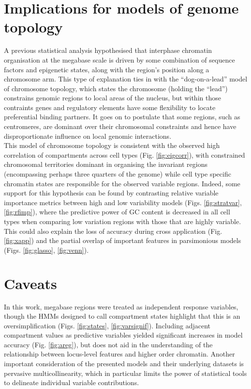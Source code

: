 \documentclass[a4paper]{report}
\begin{document}
\section{Implications for models of genome topology}
A previous statistical analysis hypothesised that interphase chromatin
organisation at the megabase scale is driven
by some combination of sequence factors and epigenetic states,
along with the region's position along a chromosome
arm.\cite{Imakaev2012} This type of explanation ties in with the ``dog-on-a-lead'' model of chromosome
topology,\cite{Krijger2013} which states the chromosome
(holding the ``lead'') constrains genomic regions to local areas of
the nucleus, but within those contraints genes and regulatory elements have some
flexibility to locate preferential binding partners.\cite{DeWit2013, Krijger2013}
It goes on to postulate that some regions, such as centromeres, are dominant over their
chromosomal constraints and hence have
disproportionate influence on local genomic interactions. \\

This model of chromosome topology is consistent with the observed
high correlation of compartments across cell types
(Fig. \ref{fig:eigcorr}), with constrained chromosomal territories dominant in
organising the invariant regions (encompassing perhaps three quarters
of the genome) while cell type specific chromatin
states are responsible for the observed variable regions. Indeed, some support
for this hypothesis can be found by contrasting relative variable importance metrics
between high and low variability models (Figs. \ref{fig:stratvar},
\ref{fig:rfimp}), where the predictive power of GC content is decreased in all cell types when
comparing low variation regions with those that are highly
variable. This could also explain
the loss of accuracy during cross application (Fig. \ref{fig:xapp})
and the partial overlap of important features in parsimonious
models (Figs. \ref{fig:glasso}, \ref{fig:venn}). \\

\section{Caveats}
In this work, megabase regions were treated as independent response
variables, though the HMMs designed to call compartment states
highlight that this is an oversimplification (Figs. \ref{fig:states}, \ref{fig:varsignif}). Including adjacent compartment
values as predictive variables yielded significant increases in model
accuracy (Fig. \ref{fig:areg}), but does not aid in the understanding
of the relationship between locus-level features and higher order
chromatin. Another important consideration of the presented models and their
underlying datasets is pervasive multicollinearity, which in
particular limits the power of statistical tools to delineate
individual variable contributions.
\end{document}
